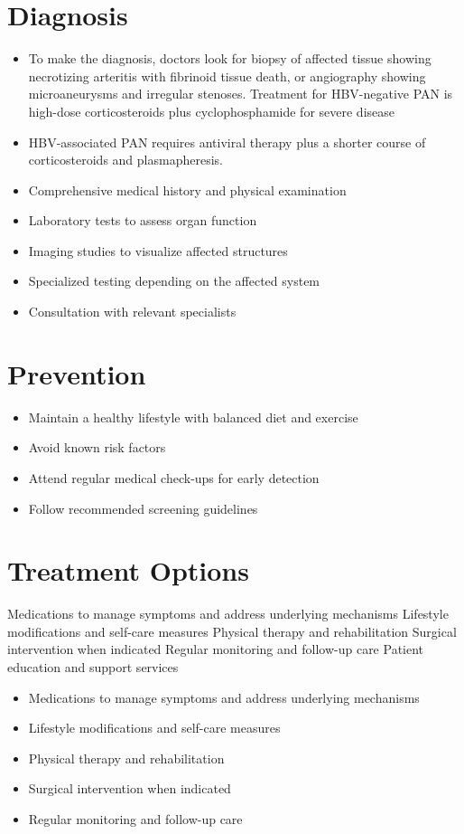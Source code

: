 \section{Diagnosis}
\begin{itemize}[noitemsep]
  \item To make the diagnosis, doctors look for biopsy of affected tissue showing necrotizing arteritis with fibrinoid tissue death, or angiography showing microaneurysms and irregular stenoses. Treatment for HBV-negative PAN is high-dose corticosteroids plus cyclophosphamide for severe disease
  \item HBV-associated PAN requires antiviral therapy plus a shorter course of corticosteroids and plasmapheresis.
  \item Comprehensive medical history and physical examination
  \item Laboratory tests to assess organ function
  \item Imaging studies to visualize affected structures
  \item Specialized testing depending on the affected system
  \item Consultation with relevant specialists
\end{itemize}
\section{Prevention}
\begin{itemize}[noitemsep]
  \item Maintain a healthy lifestyle with balanced diet and exercise
  \item Avoid known risk factors
  \item Attend regular medical check-ups for early detection
  \item Follow recommended screening guidelines
\end{itemize}
\section{Treatment Options}
Medications to manage symptoms and address underlying mechanisms Lifestyle modifications and self-care measures Physical therapy and rehabilitation Surgical intervention when indicated Regular monitoring and follow-up care Patient education and support services

\begin{itemize}[noitemsep]
  \item Medications to manage symptoms and address underlying mechanisms
  \item Lifestyle modifications and self-care measures
  \item Physical therapy and rehabilitation
  \item Surgical intervention when indicated
  \item Regular monitoring and follow-up care
\end{itemize}
